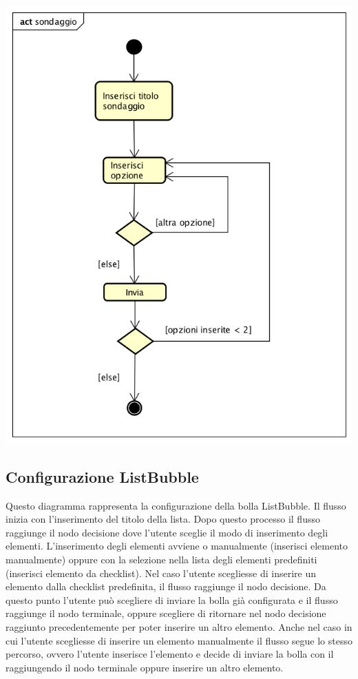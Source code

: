 \begin{center}
  \includegraphics[scale=0.5]{img/Sondaggio.png}
\end{center}


\subsection{Configurazione ListBubble}
Questo diagramma rappresenta la configurazione della bolla
ListBubble. Il flusso inizia con l’inserimento del titolo della
lista. Dopo questo processo il flusso raggiunge il nodo decisione dove
l’utente sceglie il modo di inserimento degli elementi. L’inserimento
degli elementi avviene o manualmente (inserisci elemento manualmente)
oppure con la selezione nella lista degli elementi predefiniti
(inserisci elemento da checklist). Nel caso l’utente scegliesse di
inserire un elemento dalla checklist predefinita, il flusso raggiunge
il nodo decisione. Da questo punto l’utente può scegliere di inviare
la bolla già configurata e il flusso raggiunge il nodo terminale,
oppure scegliere di ritornare nel nodo decisione raggiunto
precedentemente per poter inserire un altro elemento. Anche nel caso
in cui l’utente scegliesse di inserire un elemento manualmente il
flusso segue lo stesso percorso, ovvero l’utente inserisce l’elemento
e decide di inviare la bolla con il raggiungendo il nodo terminale
oppure inserire un altro elemento. 

